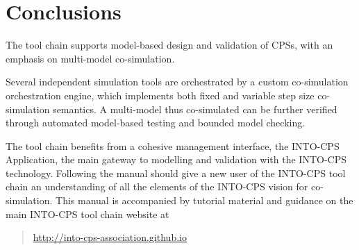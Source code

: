 \section{Conclusions}\label{sec:conclusions}
%
The tool chain supports model-based design and validation of CPSs, with an emphasis on multi-model co-simulation.

Several independent simulation tools are orchestrated by a custom co-sim\-u\-la\-tion orchestration engine, which implements both fixed and variable step size co-simulation semantics.
%
A multi-model thus co-simulated can be further verified through automated model-based testing and bounded model checking.

The tool chain benefits from a cohesive management interface, the INTO-CPS Application, the main gateway to modelling and validation with the INTO-CPS technology.
%
Following the manual should give a new user of the INTO-CPS tool chain an understanding of all the elements of the INTO-CPS vision for co-simulation.
%
This manual is accompanied by tutorial material and guidance on the main INTO-CPS tool chain website at
%
%
%
\begin{quote}
\url{http://into-cps-association.github.io}
\end{quote}